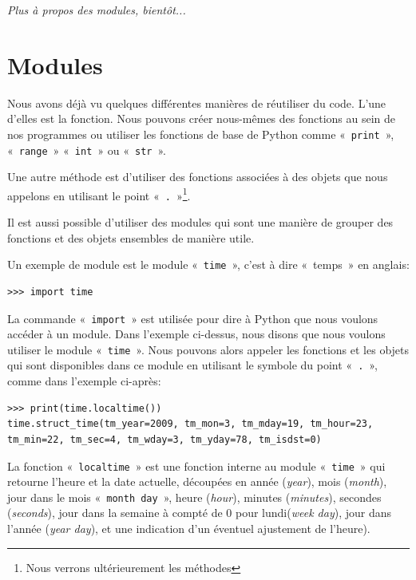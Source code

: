 \emph{Plus à propos des modules, bientôt...}

\section{Modules}
Nous avons déjà vu quelques différentes manières de réutiliser du code. L'une d'elles est la fonction. Nous pouvons créer nous-mêmes des fonctions au sein de nos programmes ou utiliser les fonctions de base de Python comme « \texttt{print} », « \texttt{range} » « \texttt{int} » ou « \texttt{str} ». 

Une autre méthode est d'utiliser des fonctions associées à des objets que nous appelons en utilisant le point « \texttt{.} »\footnote{Nous verrons ultérieurement les méthodes}.
 
Il est aussi possible d'utiliser des modules qui sont une manière de grouper des fonctions et des objets ensembles de manière utile.

Un exemple de module est le module « \texttt{time} », c'est à dire « temps »   en anglais:

\begin{Verbatim}[frame=single,rulecolor=\color{mbleu}, label=à taper]
>>> import time
\end{Verbatim}

La commande « \texttt{import} » est utilisée pour dire à Python que nous voulons accéder à un module.
Dans l'exemple ci-dessus, nous disons que nous voulons utiliser le module « \texttt{time} ».
Nous pouvons alors appeler les fonctions et les objets qui sont disponibles dans ce module en utilisant le symbole du point « \texttt{.} », comme dans l'exemple ci-après:

\begin{Verbatim}[frame=single,rulecolor=\color{mbleu}, label=à taper]
>>> print(time.localtime())
time.struct_time(tm_year=2009, tm_mon=3, tm_mday=19, tm_hour=23, 
tm_min=22, tm_sec=4, tm_wday=3, tm_yday=78, tm_isdst=0)
\end{Verbatim}

La fonction « \texttt{localtime} » est une fonction interne au module « \texttt{time} » qui retourne l'heure et la date actuelle, découpées en année (\emph{year}), mois (\emph{month}), jour dans le mois « \texttt{month day} », heure (\emph{hour}), minutes (\emph{minutes}), secondes (\emph{seconds}), jour dans la semaine à compté de 0 pour lundi(\emph{week day}), jour dans l'année (\emph{year day}), et une indication d'un éventuel ajustement de l'heure).

